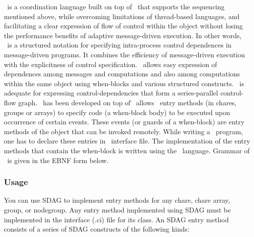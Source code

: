 \sdag\ is a coordination language built on top of \charmpp\ that supports the
sequencing mentioned above, while overcoming limitations of thread-based
languages, and facilitating a clear expression of flow of control within the
object without losing the performance benefits of adaptive message-driven
execution.  In other words, \sdag\ is a structured notation for specifying
intra-process control dependences in message-driven programs. It combines the
efficiency of message-driven execution with the explicitness of control
specification. \sdag\ allows easy expression of dependences among messages and
computations and also among computations within the same object using
when-blocks and various structured constructs.  \sdag\ is adequate for
expressing control-dependencies that form a series-parallel control-flow graph.
\sdag\ has been developed on top of \charmpp\. \sdag\ allows \charmpp\ entry
methods (in chares, groups or arrays) to specify code (a when-block body) to be
executed upon occurrence of certain events.  These events (or guards of a
when-block) are entry methods of the object that can be invoked remotely. While
writing a \sdag\ program, one has to declare these entries in \charmpp\
interface file. The implementation of the entry methods that contain the
when-block is written using the \sdag\ language. Grammar of \sdag\ is given in
the EBNF form below.

\subsubsection{Usage}

You can use SDAG to implement entry methods for any chare, chare array, group,
or nodegroup. Any entry method implemented using SDAG must be implemented in the
interface (.ci) file for its class. An SDAG entry method consists of a series of
SDAG constructs of the following kinds:

